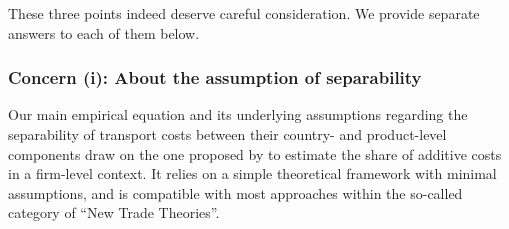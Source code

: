 \documentclass[a4paper,11pt]{article}
\begin{document}


These three points indeed deserve careful consideration. We provide separate answers to each of them below.


\subsubsection{Concern (i): About the assumption of separability}
Our main empirical equation and its underlying assumptions regarding the separability of transport costs between their country- and product-level components draw on the one proposed by \citet{Irrazabal_2015} to estimate the share of additive costs in a firm-level context. It relies on a simple theoretical framework with minimal assumptions, and is compatible with most approaches within the so-called category of ``New Trade Theories''.
\end{document}
